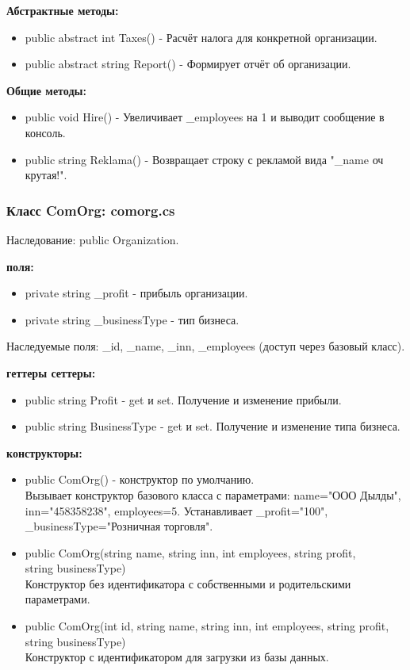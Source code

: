 \documentclass[oneside,a4paper,14pt]{extarticle}
\begin{document}
\newpage

\textbf{Абстрактные методы:}
\begin{itemize}
    \item public abstract int Taxes() - Расчёт налога для конкретной организации.
    \item public abstract string Report() - Формирует отчёт об организации.
\end{itemize}

\textbf{Общие методы:}
\begin{itemize}
    \item public void Hire() - Увеличивает \_employees на 1 и выводит сообщение в консоль.
    \item public string Reklama() - Возвращает строку с рекламой вида "\_name оч крутая!".
\end{itemize}

\subsubsection*{Класс ComOrg: comorg.cs}

Наследование: public Organization.

\textbf{поля:}
\begin{itemize}
    \item private string \_profit - прибыль организации.
    \item private string \_businessType - тип бизнеса.
\end{itemize}

Наследуемые поля: \_id, \_name, \_inn, \_employees (доступ через базовый класс).

\textbf{геттеры сеттеры:}
\begin{itemize}
    \item public string Profit - get и set. Получение и изменение прибыли.
    \item public string BusinessType - get и set. Получение и изменение типа бизнеса.
\end{itemize}

\newpage

\textbf{конструкторы:}
\begin{itemize}
    \item public ComOrg() - конструктор по умолчанию.\\
    Вызывает конструктор базового класса с параметрами: name="ООО Дылды", inn="458358238", employees=5. Устанавливает \_profit="100",\\ \_businessType="Розничная торговля".

    \item public ComOrg(string name, string inn, int employees, string profit,\\ string businessType)\\
    Конструктор без идентификатора с собственными и родительскими параметрами.

    \item public ComOrg(int id, string name, string inn, int employees, string profit, string businessType)\\
    Конструктор с идентификатором для загрузки из базы данных.
\end{itemize}
\end{document}
